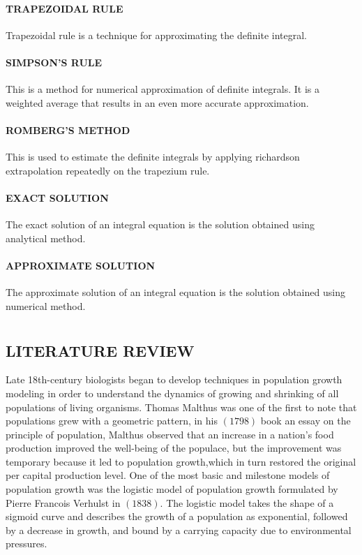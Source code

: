 \documentclass[a4paper,12pt]{report}
\numberwithin{equation}{section}
\begin{document}
\subsubsection{TRAPEZOIDAL RULE}
\indent Trapezoidal rule is a technique for approximating the definite integral.
 
\subsubsection{SIMPSON'S RULE}
\indent This is a method for numerical approximation of definite integrals. It is a weighted average that results in an even more accurate approximation.

\subsubsection{ROMBERG'S METHOD}
\indent This is used to estimate the definite integrals by applying richardson extrapolation repeatedly on the trapezium rule.

\subsubsection{EXACT SOLUTION}
\indent The exact solution of an integral equation is the solution obtained using analytical method.

\subsubsection{APPROXIMATE SOLUTION}
\indent The approximate solution of an integral equation is the solution obtained using numerical method.



\newpage

\chapter{}
\section{LITERATURE REVIEW}

\indent Late 18th-century biologists began to develop techniques in population growth modeling in order to understand the dynamics of growing and shrinking of all populations of living organisms. Thomas Malthus was one of the first to note that populations grew with a geometric pattern, in his $(1798)$ book an essay on the principle of population, Malthus observed that an increase in a nation's food production improved the well-being of the populace, but the improvement was temporary because it led to population growth,which in turn restored the original per capital production level. One of the most basic and milestone models of population growth was the logistic model of population growth formulated by Pierre Francois Verhulst in $(1838)$. The logistic model takes the shape of a sigmoid curve and describes the growth of a population as exponential, followed by a decrease in growth, and bound by a carrying capacity due to environmental pressures.\\
\end{document}
